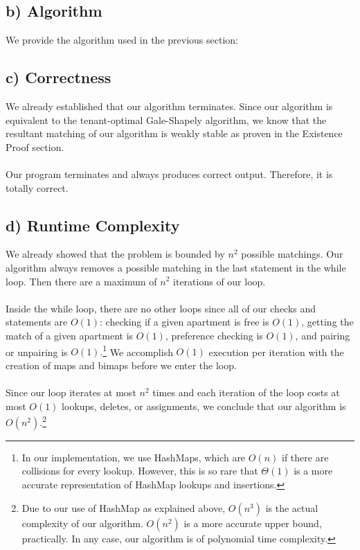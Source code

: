 \documentclass{article}
\begin{document}
\newpage
\subsection*{b) Algorithm}
We provide the algorithm used in the previous section:

\begin{algorithmic}
    \Else
        \EndIf
    \EndIf
\EndWhile
\end{algorithmic}


\subsection*{c) Correctness}
We already established that our algorithm terminates. Since our algorithm is
equivalent to the tenant-optimal Gale-Shapely algorithm, we know that the
resultant matching of our algorithm is weakly stable as proven in the
Existence Proof section. 
\\\\
Our program terminates and always produces correct output. Therefore, it is 
totally correct.


\subsection*{d) Runtime Complexity}
We already showed that the problem is bounded by $n^2$ possible matchings. Our
algorithm always removes a possible matching in the last statement in the
while loop. Then there are a maximum of $n^2$ iterations of our loop.
\\\\
Inside the while loop, there are no other loops since all of our checks and
statements are $O(1)$: checking if a given apartment is free is $O(1)$,
getting the match of a given apartment is $O(1)$, preference checking is
$O(1)$, and pairing or unpairing is $O(1).$\footnote{In our implementation,
we use HashMaps, which are $O(n)$ if there are collisions for every lookup.
However, this is so rare that $\Theta(1)$ is a more accurate representation
of HashMap lookups and insertions.} We accomplish $O(1)$ execution per
iteration with the creation of maps and bimaps before we enter the loop.
\\\\
Since our loop iterates at most $n^2$ times and each iteration of the loop
costs at most $O(1)$ lookups, deletes, or assignments, we conclude that our
algorithm is $O(n^2).$\footnote{Due to our use of HashMap as explained above,
$O(n^3)$ is the actual complexity of our algorithm. $O(n^2)$ is a
more accurate upper bound, practically. In any case, our algorithm is of
polynomial time complexity.}
\end{document}
